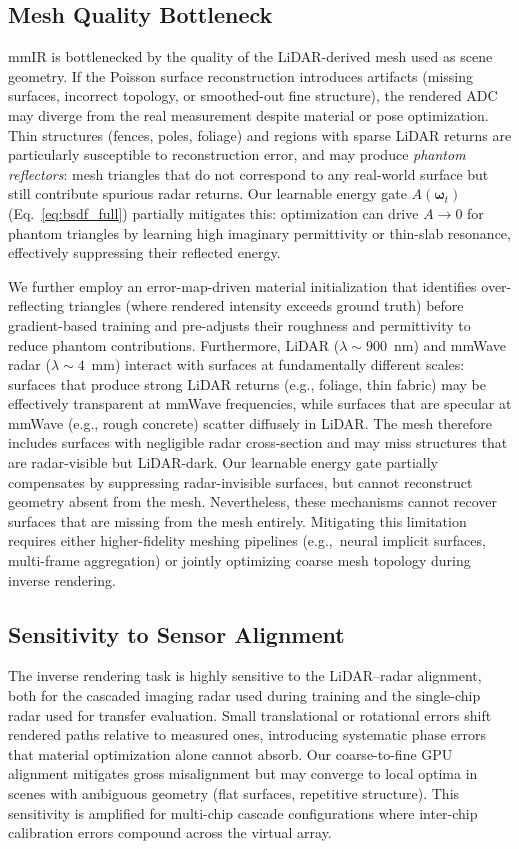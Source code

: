 \subsection{Mesh Quality Bottleneck}

mmIR is bottlenecked by the quality of the LiDAR-derived mesh used as scene geometry. If the Poisson surface reconstruction introduces artifacts (missing surfaces, incorrect topology, or smoothed-out fine structure), the rendered ADC may diverge from the real measurement despite material or pose optimization. Thin structures (fences, poles, foliage) and regions with sparse LiDAR returns are particularly susceptible to reconstruction error, and may produce \emph{phantom reflectors}: mesh triangles that do not correspond to any real-world surface but still contribute spurious radar returns. Our learnable energy gate $A(\boldsymbol{\omega}_t)$ (Eq.~\ref{eq:bsdf_full}) partially mitigates this: optimization can drive $A \to 0$ for phantom triangles by learning high imaginary permittivity or thin-slab resonance, effectively suppressing their reflected energy.

We further employ an error-map-driven material initialization that identifies over-reflecting triangles (where rendered intensity exceeds ground truth) before gradient-based training and pre-adjusts their roughness and permittivity to reduce phantom contributions. Furthermore, LiDAR ($\lambda \sim 900$~nm) and mmWave radar ($\lambda \sim 4$~mm) interact with surfaces at fundamentally different scales: surfaces that produce strong LiDAR returns (e.g., foliage, thin fabric) may be effectively transparent at mmWave frequencies, while surfaces that are specular at mmWave (e.g., rough concrete) scatter diffusely in LiDAR. The mesh therefore includes surfaces with negligible radar cross-section and may miss structures that are radar-visible but LiDAR-dark. Our learnable energy gate partially compensates by suppressing radar-invisible surfaces, but cannot reconstruct geometry absent from the mesh. Nevertheless, these mechanisms cannot recover surfaces that are missing from the mesh entirely. Mitigating this limitation requires either higher-fidelity meshing pipelines (e.g.,\ neural implicit surfaces, multi-frame aggregation) or jointly optimizing coarse mesh topology during inverse rendering.

\subsection{Sensitivity to Sensor Alignment}

The inverse rendering task is highly sensitive to the LiDAR--radar alignment, both for the cascaded imaging radar used during training and the single-chip radar used for transfer evaluation. Small translational or rotational errors shift rendered paths relative to measured ones, introducing systematic phase errors that material optimization alone cannot absorb. Our coarse-to-fine GPU alignment mitigates gross misalignment but may converge to local optima in scenes with ambiguous geometry (flat surfaces, repetitive structure). This sensitivity is amplified for multi-chip cascade configurations where inter-chip calibration errors compound across the virtual array.


